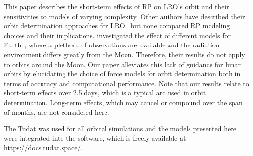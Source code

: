 This paper describes the short-term effects of \gls{RP} on \gls{LRO}'s orbit and their sensitivities to models of varying complexity. Other authors have described their orbit determination approaches for \gls{LRO}~\cite{Mazarico2011,Mazarico2018,Nicholson2010,Smith2008,Slojkowski2014,Slojkowski2015,Bauer2016,Maier2016} but none compared \gls{RP} modeling choices and their implications. \citeauthor{Vielberg2020} investigated the effect of different models for Earth~\cite{Vielberg2020}, where a plethora of observations are available and the radiation environment differs greatly from the Moon. Therefore, their results do not apply to orbits around the Moon. Our paper alleviates this lack of guidance for lunar orbits by elucidating the choice of force models for orbit determination both in terms of accuracy and computational performance. Note that our results relate to short-term effects over 2.5 days, which is a typical arc used in orbit determination. Long-term effects, which may cancel or compound over the span of months, are not considered here.

The \gls{Tudat} was used for all orbital simulations and the models presented here were integrated into the software, which is freely available at \url{https://docs.tudat.space/}.

{\let\thefootnote\relax{}}
